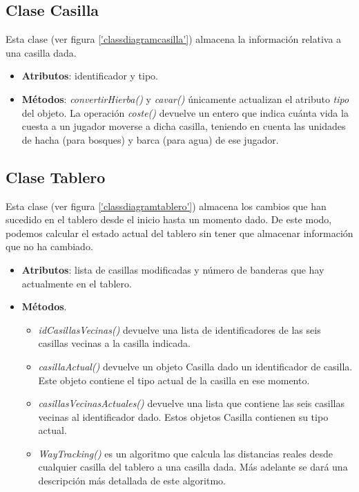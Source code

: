 
\subsection {Clase Casilla}
Esta clase (ver figura \ref{'classdiagramcasilla'}) almacena la
información relativa a una casilla dada.
\begin{itemize}
\item \textbf{Atributos}: identificador y tipo.
\item \textbf{Métodos}: \emph{convertirHierba()} y \emph{cavar()} únicamente
  actualizan el atributo \emph{tipo} del objeto. La operación
  \emph{coste()} devuelve un entero que indica cuánta vida la cuesta a
  un jugador moverse a dicha casilla, teniendo en cuenta las unidades
  de hacha (para bosques) y barca (para agua) de ese jugador.
\end{itemize}


\subsection {Clase Tablero}
Esta clase (ver figura \ref{'classdiagramtablero'}) almacena los
cambios que han sucedido en el tablero desde el inicio hasta un
momento dado. De este modo, podemos calcular el estado actual del
tablero sin tener que almacenar información que no ha cambiado.
\begin{itemize}
\item \textbf{Atributos}: lista de casillas modificadas y número de banderas
  que hay actualmente en el tablero.
\item \textbf{Métodos}.
  \begin{itemize}
  \item \emph{idCasillasVecinas()} devuelve una lista de
    identificadores de las seis casillas vecinas a la casilla indicada.
  \item \emph{casillaActual()} devuelve un objeto Casilla dado un
    identificador de casilla. Este objeto contiene el tipo actual de
    la casilla en ese momento.
  \item \emph{casillasVecinasActuales()} devuelve una lista que
    contiene las seis casillas vecinas al identificador dado. Estos
    objetos Casilla contienen su tipo actual.
  \item \emph{WayTracking()} es un algoritmo que calcula las
    distancias reales desde cualquier casilla del tablero a una
    casilla dada. Más adelante se dará una descripción más detallada
    de este algoritmo.
  \end{itemize}
\end{itemize}

